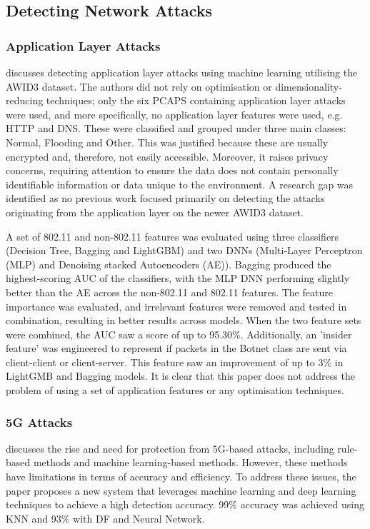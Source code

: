 \subsection{Detecting Network Attacks}

\subsubsection*{Application Layer Attacks}

\textcite{s22155633} discusses detecting application layer attacks using machine learning utilising the AWID3 dataset. The authors did not rely on optimisation or dimensionality-reducing techniques; only the six PCAPS containing application layer attacks were used, and more specifically, no application layer features were used, e.g. HTTP and DNS. These were classified and grouped under three main classes: Normal, Flooding and Other. This was justified because these are usually encrypted and, therefore, not easily accessible. Moreover, it raises privacy concerns, requiring attention to ensure the data does not contain personally identifiable information or data unique to the environment. A research gap was identified as no previous work focused primarily on detecting the attacks originating from the application layer on the newer AWID3 dataset.

A set of 802.11 and non-802.11 features was evaluated using three classifiers (Decision Tree, Bagging and LightGBM) and two DNNs (Multi-Layer Perceptron (MLP) and Denoising stacked Autoencoders (AE)). Bagging produced the highest-scoring AUC of the classifiers, with the MLP DNN performing slightly better than the AE across the non-802.11 and 802.11 features. The feature importance was evaluated, and irrelevant features were removed and tested in combination, resulting in better results across models. When the two feature sets were combined, the AUC saw a score of up to 95.30\%. Additionally, an 'insider feature' was engineered to represent if packets in the Botnet class are sent via client-client or client-server. This feature saw an improvement of up to 3\% in LightGMB and Bagging models. It is clear that this paper does not address the problem of using a set of application features or any optimisation techniques.  
\subsubsection*{5G Attacks}

\textcite{Mughaid2022} discusses the rise and need for protection from 5G-based attacks, including rule-based methods and machine learning-based methods. However, these methods have limitations in terms of accuracy and efficiency. To address these issues, the paper proposes a new system that leverages machine learning and deep learning techniques to achieve a high detection accuracy. 99\% accuracy was achieved using KNN and 93\% with DF and Neural Network.

